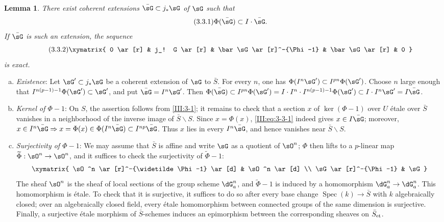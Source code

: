 \documentclass[12pt,oneside,english]{smfbook}
\DeclareMathOperator{\spec}{Spec}
\newcommand{\et}[1]{{#1}_{\textnormal{et}}}
\renewcommand{\setminus}{\smallsetminus}
\newtheorem{lemma_}[subsection]{Lemma}
\begin{document}
\begin{lemma_}\label{III:3-3}
There exist coherent extensions $\bar\sG\subset j_*\sG$ of $\sG$ such that
\begin{equation*}\tag{3.3.1}\label{III:eq:3-3-1}
  \Phi(\bar\sG)\subset I\cdot \bar\sG\text{.}
\end{equation*}
If $\bar\sG$ is such an extension, the sequence
\begin{equation*}\tag{3.3.2}\label{III:eq:3-3-2}
\xymatrix{
  0 \ar[r]
    & j_! G \ar[r]
    & \bar\sG \ar[r]^-{\Phi-1}
    & \bar\sG \ar[r]
    & 0
}
\end{equation*}
is exact.
\end{lemma_}
\begin{enumerate}[a)]
  \item \emph{Existence}: Let $\sG'\subset j_*\sG$ be a coherent extension of $\sG$ to $\bar S$. For every $n$, one has $\Phi(I^n\sG')\subset I^{pn}\Phi(\sG')$. Choose $n$ large enough that $I^{n(p-1)-1}\Phi(\sG')\subset\sG'$, and put $\bar\sG=I^n\sG'$. Then $\Phi(\bar\sG)\subset I^{pn}\Phi(\sG') =I\cdot I^n\cdot I^{n(p-1)-1}\Phi(\sG')\subset I\cdot I^n\sG' =I\bar\sG$.
  \item \emph{Kernel of $\Phi-1$}: On $S$, the assertion follows from \ref{III:3-1}; it remains to check that a section $x$ of $\ker(\Phi-1)$ over $U$ étale over $\bar S$ vanishes in a neighborhood of the inverse image of $\bar S\setminus S$. Since $x=\Phi(x)$, \eqref{III:eq:3-3-1} indeed gives $x\in I\bar\sG$; moreover, $x\in I^n\bar\sG\Rightarrow x=\Phi(x)\in\Phi(I^n\bar\sG)\subset I^{np}\bar\sG$. Thus $x$ lies in every $I^n\bar\sG$, and hence vanishes near $\bar S\setminus S$.
  \item \emph{Surjectivity of $\Phi-1$}: We may assume that $\bar S$ is affine and write $\sG$ as a quotient of $\sO^n$; $\Phi$ then lifts to a $p$-linear map $\widetilde\Phi:\sO^n\to\sO^n$, and it suffices to check the surjectivity of $\widetilde\Phi-1$:
    \[\xymatrix{
      \sO^n \ar[r]^-{\widetilde \Phi-1} \ar[d]
        & \sO^n \ar[d] \\
      \sG \ar[r]^-{\Phi-1}
        & \sG
    }\]
    The sheaf $\sO^n$ is the sheaf of local sections of the group scheme $\dG_a^n$, and $\widetilde\Phi-1$ is induced by a homomorphism $\dG_a^n\to\dG_a^n$. This homomorphism is étale. To check that it is surjective, it suffices to do so after every base change $\spec(k)\to\bar S$ with $k$ algebraically closed; over an algebraically closed field, every étale homomorphism between connected groups of the same dimension is surjective. Finally, a surjective étale morphism of $\bar S$-schemes induces an epimorphism between the corresponding sheaves on $\et{\bar S}$.
\end{enumerate}
\end{document}
